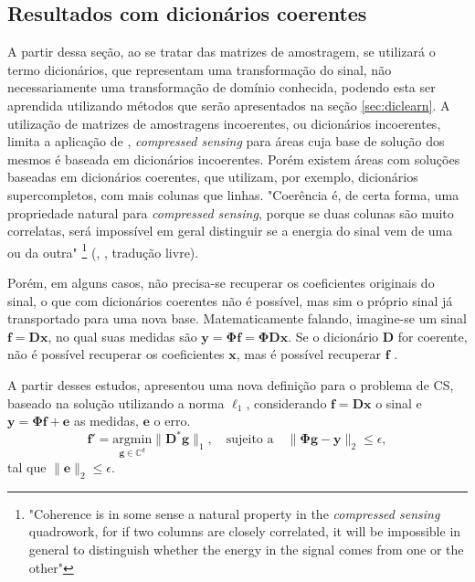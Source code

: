 \documentclass[cic,tc]{iiufrgs}
\renewcommand{\vec}[1]{\bm{#1}}
\begin{document}
\subsection{Resultados com dicionários coerentes}
A partir dessa seção, ao se tratar das matrizes de amostragem, se utilizará 
o termo dicionários, que representam uma transformação do sinal, 
não necessariamente uma transformação de domínio conhecida,
podendo esta ser aprendida utilizando métodos que serão apresentados na seção \ref{sec:diclearn}.
A utilização de matrizes de amostragens incoerentes, ou dicionários incoerentes, 
limita a aplicação de ,
\emph{compressed sensing} para áreas cuja base de solução dos mesmos é baseada
em dicionários incoerentes.
Porém existem áreas com soluções baseadas em dicionários coerentes, que utilizam, 
por exemplo, dicionários supercompletos, com mais colunas que linhas. 
"Coerência é, de certa forma, uma propriedade natural para \emph{compressed sensing}, 
porque se duas colunas são muito correlatas, será impossível em geral distinguir se a energia do sinal
vem de uma ou da outra" 
\footnote{"Coherence is in some sense a natural property in the \emph{compressed sensing} quadrowork, for if two
columns are closely correlated, it will be impossible in general to distinguish whether the energy in 
the signal comes from one or the other"}
(\citeauthor{CANDESDICTS}, \citeyear{CANDESDICTS}, tradução livre).

Porém, em alguns casos, não precisa-se recuperar os coeficientes originais do sinal, o que com dicionários 
coerentes não é possível, mas sim o próprio sinal já transportado para uma nova base.
Matematicamente falando, imagine-se um sinal $\vec{f} = \mathbf{D}\vec{x}$, no qual suas medidas são
$\vec{y} = \mathbf{\Phi}\vec{f} = \mathbf{\Phi}\mathbf{D}\vec{x}$. 
Se o dicionário $\mathbf{D}$ for
coerente, não é possível recuperar os coeficientes $\vec{x}$, mas é possível recuperar $\vec{f}$ \cite{CANDESDICTS}.

A partir desses estudos, \citet{CANDESDICTS} apresentou uma nova definição para o problema de CS, 
baseado na solução utilizando a norma $\ell_1$, considerando $\vec{f} = \mathbf{D}\vec{x}$ o sinal
e $\vec{y} = \mathbf{\Phi}\vec{f} + \vec{e}$ as medidas, $\vec{e}$ o erro.
\begin{equation}
    \label{eq:problemDl1}
    \vec{f'} = \underset{\vec{g} \in \mathbb{C}^d}{\text{argmin}} \lVert \mathbf{D}^*\vec{g} \rVert_1, 
    \hspace{1em} \text{sujeito a} \hspace{1em}
    \lVert \mathbf{\Phi} \vec{g} - \vec{y} \rVert_2 \le \epsilon, 
\end{equation}
tal que $\lVert \vec{e} \rVert_2 \le \epsilon $.
\end{document}
